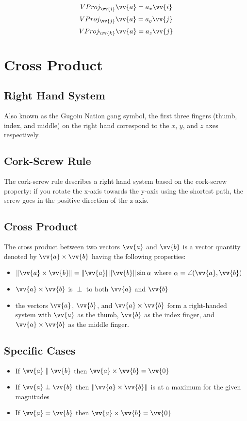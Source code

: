 			\[VProj_{\vv{i}}\vv{a} = a_x\vv{i}\]
			\[VProj_{\vv{j}}\vv{a} = a_y\vv{j}\]
			\[VProj_{\vv{k}}\vv{a} = a_z\vv{j}\]
	\section{Cross Product}
		\subsection{Right Hand System}
			Also known as the Gugoiu Nation gang symbol, the first three fingers (thumb, index, and middle) on the right hand correspond to the $x$, $y$, and $z$ axes respectively.
		\subsection{Cork-Screw Rule}
			The cork-screw rule describes a right hand system based on the cork-screw property: if you rotate the x-axis towards the y-axis using the shortest path, the screw goes in the positive direction of the z-axis.
		\subsection{Cross Product}
			The cross product between two vectors $\vv{a}$ and $\vv{b}$ is a vector quantity denoted by $\vv{a} \times \vv{b}$ having the following properties:
			\begin{itemize}
				\item $\|\vv{a} \times \vv{b}\| = \|\vv{a}\|\|\vv{b}\|\sin\alpha$ \qquad where $\alpha = \angle(\vv{a}, \vv{b})$
				\item $\vv{a} \times \vv{b}$ is $\perp$ to both $\vv{a}$ and $\vv{b}$
				\item the vectors $\vv{a}$, $\vv{b}$, and $\vv{a} \times \vv{b}$ form a right-handed system with $\vv{a}$ as the thumb, $\vv{b}$ as the index finger, and $\vv{a} \times \vv{b}$ as the middle finger.
			\end{itemize}
		\subsection{Specific Cases}
			\begin{itemize}
				\item If $\vv{a} \parallel \vv{b}$ then $\vv{a} \times \vv{b} = \vv{0}$
				\item If $\vv{a} \perp \vv{b}$ then $\|\vv{a} \times \vv{b}\|$ is at a maximum for the given magnitudes
				\item If $\vv{a} = \vv{b}$ then $\vv{a} \times \vv{b} = \vv{0}$
			\end{itemize}
